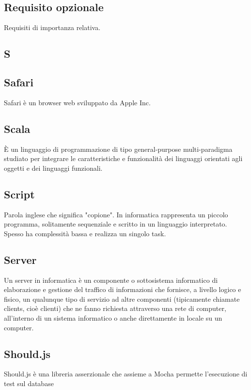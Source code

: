\subsection{Requisito opzionale}
Requisiti di importanza relativa.

\newpage

\begin{center}
\Huge\section{\uppercase{S}}
\end{center}

\subsection{Safari}
Safari è un browser web sviluppato da Apple Inc. 

\subsection{Scala}
È un linguaggio di programmazione di tipo general-purpose multi-paradigma studiato per integrare le caratteristiche e funzionalità dei linguaggi orientati agli oggetti e dei linguaggi funzionali.

\subsection{Script}
Parola inglese che significa "copione". In informatica rappresenta un piccolo
programma, solitamente sequenziale e scritto in un linguaggio interpretato.
Spesso ha complessità bassa e realizza un singolo task.

\subsection{Server}
Un server in informatica è un componente o sottosistema informatico di elaborazione e gestione del traffico di informazioni che fornisce, a livello logico e fisico, un qualunque tipo di servizio ad altre componenti (tipicamente chiamate clients, cioè clienti) che ne fanno richiesta attraverso una rete di computer, all'interno di un sistema informatico o anche direttamente in locale su un computer.

\subsection{Should.js}
Should.js è una libreria asserzionale che assieme a Mocha permette l'esecuzione di test sul database

